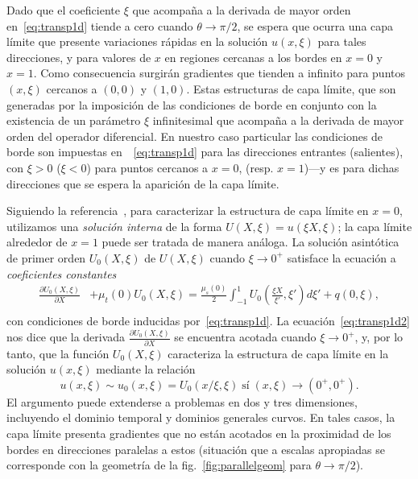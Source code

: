 Dado que el coeficiente $\xi$ que acompaña a la derivada de mayor 
orden en~\eqref{eq:transp1d} tiende a cero cuando $\theta \to \pi/2$, 
se espera que ocurra una capa límite que presente variaciones rápidas 
en la solución $u(x,\xi)$ para tales direcciones, y para valores 
de $x$ en regiones cercanas a los bordes en $x=0$ y $x=1$.
Como consecuencia surgirán gradientes que 
tienden a infinito para puntos $(x,\xi)$ cercanos a $(0,0)$ y $(1,0)$. 
Estas estructuras de capa límite, que son generadas por 
la imposición de las condiciones de borde en conjunto con la existencia 
de un parámetro $\xi$ infinitesimal que acompaña a la derivada de mayor 
orden del operador diferencial. En nuestro caso particular 
las condiciones de borde son impuestas en~~\eqref{eq:transp1d} para las direcciones 
entrantes (salientes), con $\xi>0$ ($\xi<0$) para puntos cercanos 
a $x=0$, (resp. $x=1$)---y es para dichas direcciones que 
se espera la aparición de la capa límite.

Siguiendo la referencia~\cite{Bender1999}, para caracterizar
la estructura de capa límite en \eg $x=0$, utilizamos una 
{\em solución interna} de la forma $U(X,\xi) = u(\xi X,\xi)$; 
la capa límite alrededor de $x=1$ puede ser tratada de manera 
análoga. La solución asintótica de primer orden $U_0(X,\xi)$ 
de $U(X,\xi)$ cuando $\xi\to 0^+$ satisface la ecuación 
a {\em coeficientes constantes} 
\begin{equation}
\begin{split}
\frac{\partial U_0(X,\xi)}{\partial X}& + \mu_t(0) U_0(X,\xi)=\frac{\mu_s(0)}{2} 
\int_{-1}^{1} U_0\left(\frac{\xi X}{\xi'},\xi'\right) d\xi' +q(0,\xi),\\
\end{split}
\label{eq:transp1d2}
\end{equation}
con condiciones de borde inducidas por~\eqref{eq:transp1d}. 
La ecuación~\eqref{eq:transp1d2} nos dice que la derivada 
$\frac{\partial U_0(X,\xi)}{\partial X}$ se encuentra 
acotada cuando $\xi\to 0^+$, y, por lo tanto, que la función 
$U_0(X,\xi)$ caracteriza la estructura de capa límite 
en la solución $u(x,\xi)$ mediante la relación 
\begin{equation}
  u(x,\xi)\sim u_0(x,\xi) = U_0(x/\xi,\xi) \; \text{sí}  \;  (x,\xi)\to (0^+,0^+).
\end{equation}
El argumento puede extenderse a problemas en dos y tres dimensiones, 
incluyendo el dominio temporal y dominios generales curvos. En tales casos, 
la capa límite presenta gradientes que no están acotados 
en la proximidad de los bordes en direcciones paralelas a estos 
(situación que a escalas apropiadas se corresponde con la geometría 
de la fig.~\ref{fig:parallelgeom} para $\theta \to \pi/2$). 

